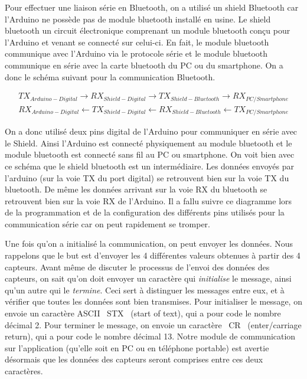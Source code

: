 \documentclass{polytech/polytech}
\begin{document}
Pour effectuer une liaison série en Bluetooth, on a utilisé un shield Bluetooth car l'Arduino ne possède pas de module bluetooth installé en usine. Le shield bluetooth un circuit électronique comprenant un module bluetooth conçu pour l'Arduino et venant se connecté sur celui-ci. En fait, le module bluetooth communique avec l'Arduino via le protocole série et le module bluetooth communique en série avec la carte bluetooth du PC ou du smartphone. On a donc le schéma suivant pour la communication Bluetooth.

\begin{eqnarray}
TX_{Arduino-Digital} \rightarrow RX_{Shield-Digital} \rightarrow TX_{Shield-Bluetooth} \rightarrow RX_{PC/Smartphone}  \\
RX_{Arduino-Digital} \leftarrow TX_{Shield-Digital} \leftarrow RX_{Shield-Bluetooth} \leftarrow TX_{PC/Smartphone}
\end{eqnarray}

On a donc utilisé deux pins digital de l'Arduino pour communiquer en série avec le Shield. 
Ainsi l'Arduino est connecté physiquement au module bluetooth et le module bluetooth est connecté sans fil au PC ou smartphone. 
On voit bien avec ce schéma que le shield bluetooth est un intermédiaire. 
Les données envoyés par l'arduino (sur la voie TX du port digital) se retrouvent bien sur la voie TX du bluetooth.
 De même les données arrivant sur la voie RX du bluetooth se retrouvent bien sur la voie RX de l'Arduino.
  Il a fallu suivre ce diagramme lors de la programmation et de la configuration des différents pins utilisés pour la communication série car on peut rapidement se tromper.

Une fois qu'on a initialisé la communication, on peut envoyer les données. Nous rappelons que le but est d’envoyer les 4 différentes valeurs obtenues à partir des 4 capteurs. Avant même de discuter le processus de l'envoi des données des capteurs, on sait qu'on doit envoyer un caractère qui \textit{initialise} le message, ainsi qu’un autre qui le \textit{termine}. Ceci sert à distinguer les messages entre eux, et à vérifier que toutes les données sont bien transmises. Pour initialiser le message, on envoie un caractère ASCII \guillemotleft\ STX \guillemotright\ (start of text), qui a pour code le nombre décimal 2. Pour terminer le message, on envoie un caractère \guillemotleft\ CR \guillemotright\ (enter/carriage return), qui a pour code le nombre décimal 13. Notre module de communication sur l'application (qu'elle soit en PC ou en téléphone portable) est avertie désormais que les données des capteurs seront comprises entre ces deux caractères.
\end{document}
